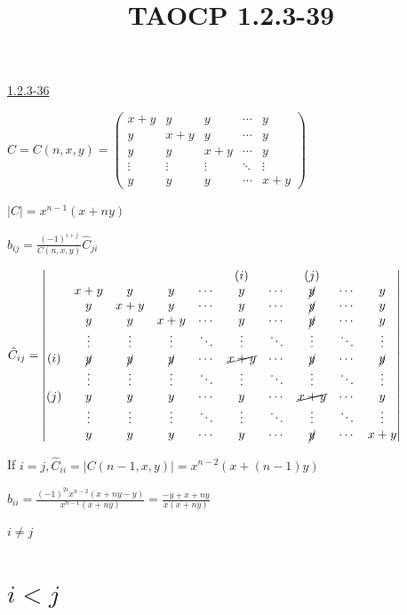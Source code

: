 \documentclass{article}
\title{TAOCP 1.2.3\mbox{-}39}
\begin{document}
\maketitle

\href{./1.2.3-36.pdf}{1.2.3\mbox{-}36}

\( C = C(n,x,y) = \left(\begin{matrix}x + y & y & y & \cdots & y \\ y & x + y & y & \cdots & y \\ y & y & x + y & \cdots & y \\ \vdots & \vdots & \vdots & \ddots & \vdots \\ y & y & y & \cdots & x + y \end{matrix}\right) \)

\( |C| = x^{n-1}(x+ny) \)

\( b_{ij} = \frac{{(-1)}^{i+j}}{C(n,x,y)} \hat{C}_{ji} \)

\( \hat{C}_{ij} = \left|\begin{matrix} & & & & & (i) & & (j) \\ & x + y & y & y & \cdots & y & \cdots & \cancel{y} & \cdots & y \\ & y & x + y & y & \cdots & y & \cdots & \cancel{y} & \cdots & y \\ & y & y & x + y & \cdots & y & \cdots & \cancel{y} & \cdots & y \\ & \vdots & \vdots & \vdots & \ddots & \vdots & \ddots & \vdots & \ddots & \vdots \\ (i) & \cancel{y} & \cancel{y} & \cancel{y} & \cdots & \cancel{x+y} & \cdots & \cancel{y} & \cdots & \cancel{y}\\ & \vdots & \vdots & \vdots & \ddots & \vdots & \ddots & \vdots & \ddots & \vdots \\ (j) & y & y & y & \cdots & y & \cdots & \cancel{x+y} & \cdots & y \\ & \vdots & \vdots & \vdots & \ddots & \vdots & \ddots & \vdots & \ddots & \vdots \\ & y & y & y & \cdots & y & \cdots & \cancel{y} & \cdots & x + y \end{matrix}\right| \)

If \( i=j, \hat{C}_{ii} = |C(n-1,x,y)| = x^{n-2}(x+(n-1)y) \)

\( b_{ii} = \frac{{(-1)}^{2i}x^{n-2}(x+ny-y)}{x^{n-1}(x+ny)} = \frac{-y+x+ny}{x(x+ny)} \)

\( i \neq j \)

\section*{\( i < j \)}
\end{document}
